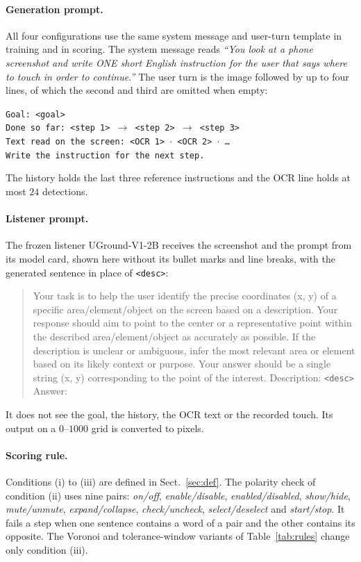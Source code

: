 \documentclass[runningheads,a4paper]{llncs}
\begin{document}
\paragraph{Generation prompt.}
All four configurations use the same system message and user-turn template in training and in scoring. The system message reads \emph{``You look at a phone screenshot and write ONE short English instruction
for the user that says where to touch in order to continue.''} The user turn is the image followed
by up to four lines, of which the second and third are omitted when empty:
\begin{center}
\texttt{Goal: <goal>}\\
\texttt{Done so far: <step 1> $\rightarrow$ <step 2> $\rightarrow$ <step 3>}\\
\texttt{Text read on the screen: <OCR 1> $\cdot$ <OCR 2> $\cdot$ \dots}\\
\texttt{Write the instruction for the next step.}
\end{center}
The history holds the last three reference instructions and the
OCR line holds at most $24$ detections.

\paragraph{Listener prompt.}
The frozen listener UGround-V1-2B receives the screenshot and the prompt from its model card, shown here without its bullet marks and line breaks, with the generated sentence in place of \texttt{<desc>}:
\begin{quote}\small
Your task is to help the user identify the precise coordinates (x, y) of a specific
area/element/object on the screen based on a description. Your response should aim to point to the
center or a representative point within the described area/element/object as accurately as possible.
If the description is unclear or ambiguous, infer the most relevant area or element based on its
likely context or purpose. Your answer should be a single string (x, y) corresponding to the point
of the interest. Description: \texttt{<desc>} Answer:
\end{quote}
It does not see the goal, the history, the OCR text or the recorded touch. Its output on a
$0$--$1000$ grid is converted to pixels.

\paragraph{Scoring rule.}
Conditions (i) to (iii) are defined in Sect.~\ref{sec:def}. The polarity check of condition (ii) uses nine pairs: \emph{on/off}, \emph{enable/disable}, \emph{enabled/disabled}, \emph{show/hide}, \emph{mute/unmute}, \emph{expand/collapse}, \emph{check/uncheck}, \emph{select/deselect} and \emph{start/stop}. It fails a step when one sentence contains a word of a pair  and the other contains its opposite. The Voronoi and tolerance-window variants of Table~\ref{tab:rules} change only condition (iii).
\end{document}
